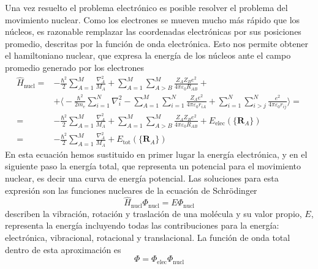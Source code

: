 Una vez resuelto el problema electrónico es posible resolver 
el problema del movimiento nuclear. Como los electrones se 
mueven mucho más rápido que los núcleos, es razonable
remplazar las coordenadas electrónicas por sus posiciones 
promedio, descritas por la función de onda electrónica. Esto
nos permite obtener el hamiltoniano nuclear, que expresa la 
energía de los núcleos ante el campo promedio generado por los
electrones
\begin{equation}
 \begin{split}  
    \hat{H}_\mathrm{nucl}=&-\frac{\hbar^2}{2}\sum_{A=1}^M\frac{\nabla^2_A}{M_A}
    +\sum_{A=1}^M\sum_{A>B}^M\frac{Z_AZ_Be^2}{4\pi\varepsilon_0R_{AB}} 
    +
    \\
    &+\Bigg\langle-\frac{\hbar^2}{2m_e}\sum_{i=1}^N\nabla^2_i 
    -\sum_{A=1}^M\sum_{i=1}^{N}\frac{Z_Ae^2}{4\pi\varepsilon_0r_{iA}} 
    +\sum_{i=1}^N\sum_{i>j}^N \frac{e^2}{4\pi\varepsilon_0r_{ij}} \Bigg\rangle =
    \\
    =&-\frac{\hbar^2}{2}\sum_{A=1}^M\frac{\nabla^2_A}{M_A} + \sum_{A=1}^M\sum_{A>B}^M\frac{Z_AZ_Be^2}{4\pi\varepsilon_0R_{AB}} + E_\mathrm{elec}(\{ \mathbf{R}_A\})
    \\
    =&-\frac{\hbar^2}{2}\sum_{A=1}^M\frac{\nabla^2_A}{M_A} + E_\mathrm{tot}(\{ \mathbf{R}_A\})
\end{split}
\end{equation}
En esta ecuación hemos sustituido en primer lugar
la energía electrónica, y en el siguiente paso
la energía total, que representa un potencial 
para el movimiento nuclear, es decir una 
curva de energía potencial. Las soluciones
para esta expresión son las funciones nucleares de
la ecuación de Schrödinger
\begin{equation}
    \hat{H}_\mathrm{nucl}\Phi_\mathrm{nucl} = E\Phi_\mathrm{nucl}
\end{equation}
describen la vibración, rotación y traslación
de una molécula y su valor propio, $E$,
representa la energía incluyendo todas  
las contribuciones para la energía: 
electrónica, vibracional, rotacional y
translacional. La función de onda total
dentro de esta aproximación es
\begin{equation}
    \Phi=\Phi_\mathrm{elec}\Phi_\mathrm{nucl}
\end{equation}

